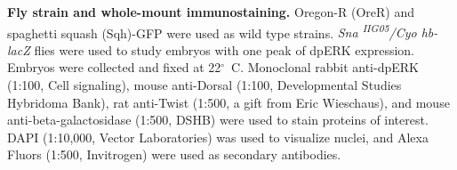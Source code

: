 \documentclass{pnastwo}
\begin{document}
\begin{article}


%





\begin{materials}

\textbf{Fly strain and whole-mount immunostaining.}
%
Oregon-R (OreR) and spaghetti squash (Sqh)-GFP were used as wild type strains. 
%
{\it Sna \textsuperscript{IIG05}/Cyo hb-lacZ} flies were used to study embryos with one peak of dpERK expression.  
%
Embryos were collected and fixed at 22$^\circ$~C. 
%
Monoclonal rabbit anti-dpERK (1:100, Cell signaling), mouse anti-Dorsal (1:100, Developmental Studies Hybridoma Bank), rat anti-Twist (1:500, a gift from Eric Wieschaus), and mouse anti-beta-galactosidase (1:500, DSHB) were used to stain proteins of interest. DAPI (1:10,000, Vector Laboratories) was used to visualize nuclei, and Alexa Fluors (1:500, Invitrogen) were used as secondary antibodies. 


\end{materials}
\end{article}
\end{document}
